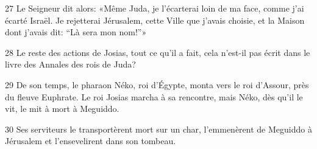 
27 Le Seigneur dit alors: «Même Juda, je l’écarterai loin de ma face, comme j’ai écarté Israël. Je rejetterai Jérusalem, cette Ville que j’avais choisie, et la Maison dont j’avais dit: “Là sera mon nom!”»

28 Le reste des actions de Josias, tout ce qu’il a fait, cela n’est-il pas écrit dans le livre des Annales des rois de Juda?

29 De son temps, le pharaon Néko, roi d’Égypte, monta vers le roi d’Assour, près du fleuve Euphrate. Le roi Josias marcha à sa rencontre, mais Néko, dès qu’il le vit, le mit à mort à Meguiddo.

30 Ses serviteurs le transportèrent mort sur un char, l’emmenèrent de Meguiddo à Jérusalem et l’ensevelirent dans son tombeau. 
